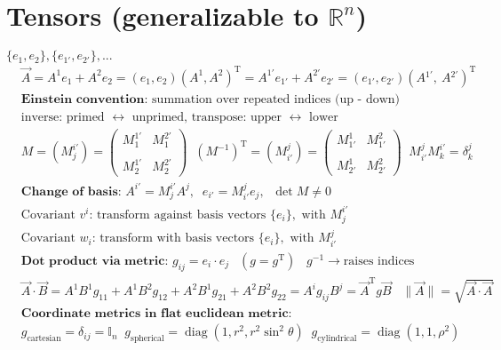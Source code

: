 \section*{\normalsize Tensors {\normalfont\scriptsize (generalizable to $\mathbb{R}^n$)}}
\underline{} $\{e_1, e_2\}, \{e_{1'}, e_{2'}\}, ... $
\begin{align*}
&\vec{A} = A^1 e_1\! +\! A^2 e_2 = (e_1\!, e_2\!) (A^1, A^2)^\mathrm{T} = A^{1'} e_{1'} \!+ \!A^{2'} e_{2'} = (e_{1'}\!, e_{2'}\!) (A\!^{1'}\!,\ A\!^{2'}\!)^\mathrm{T}\\
&\textbf{Einstein convention: } \text{summation over repeated indices (up - down)} \\
&\text{inverse: primed $\leftrightarrow$ unprimed,  transpose: upper $\leftrightarrow$ lower} \\
&M = (M^{i'}_j) = \begin{pmatrix} M^{1'}_1 & M^{2'}_1 \\ \\ M^{1'}_2 & 
M^{2'}_2 \end{pmatrix} \; \; (M^{-1})^\mathrm{T}=(M^j_{i'}) = \begin{pmatrix} M^{1}_{1'} & M^{2}_{1'} \\ \\ M^{1}_{2'} & 
M^{2}_{2'} \end{pmatrix} \; \;  M^j_{i'} M^{i'}_k= \delta^j_k \\
&\textbf{Change of basis: } A^{i'} = M^{i'}_j A^j, \;\; e_{i'} = M^j_{i'} e_j,\;\; \det M \neq 0 \\
&\text{Covariant $v^i$: transform against basis vectors $\{e_i\},$ with ${M_{j}^{i'}}$}\\
&\text{Covariant $w_i$: transform with basis vectors $\{e_i\},$ with ${M_{i'}^j}$}\\
&\textbf{Dot product via metric: } g_{ij} = e_i \cdot e_j\ \;\; (g=g^\mathrm{T}) \;\; \; g^{-1} \rightarrow \text{raises indices} \\
&\vec{A} \cdot \vec{B} = A^1\! B^1\! g_{11} \!+\! A^1\! B^2\! g_{12} \!+\! A^2\! B^1\! g_{21} \!+\! A^2\! B^2\! g_{22} \!= \! A^i\! g_{ij} B^j \!= \! \vec{A}^\mathrm{T}\! g\! \vec{B} \;\;\; \|\vec{A}\| \!= \!\sqrt{\vec{A} \!\cdot\! \vec{A}}\\
&\textbf{Coordinate metrics in flat euclidean metric: } \\
&g_{\text{cartesian}}\! = \!\delta\!_{i\!j} \!=\! \mathbb{I}_n\; \; g_{\text{spherical}} \!=\! \operatorname{diag} (1, r^2 , r^2 \sin ^2 \theta)\; \;  g_{\text{cylindrical}}\! =\! \operatorname{diag}(1,1,\rho^2) 
\end{align*}
